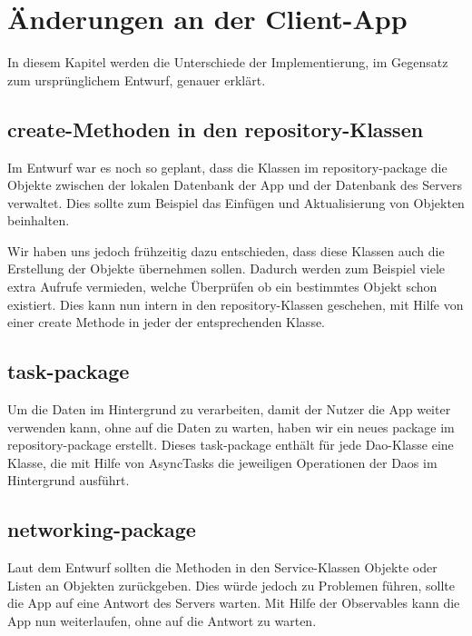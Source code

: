 
\section{Änderungen an der Client-App}

    In diesem Kapitel werden die Unterschiede der Implementierung, im Gegensatz zum ursprünglichem Entwurf, genauer erklärt.

    \subsection{create-Methoden in den repository-Klassen}

        Im Entwurf war es noch so geplant, dass die Klassen im repository-package die Objekte zwischen der lokalen Datenbank der App und der Datenbank des Servers verwaltet. Dies sollte zum Beispiel das Einfügen und Aktualisierung von Objekten beinhalten.

        Wir haben uns jedoch frühzeitig dazu entschieden, dass diese Klassen auch die Erstellung der Objekte übernehmen sollen. Dadurch werden zum Beispiel viele extra Aufrufe vermieden, welche Überprüfen ob ein bestimmtes Objekt schon existiert. Dies kann nun intern in den repository-Klassen geschehen, mit Hilfe von einer create Methode in jeder der entsprechenden Klasse.

    \subsection{task-package}

         Um die Daten im Hintergrund zu verarbeiten, damit der Nutzer die App weiter verwenden kann, ohne auf die Daten zu warten, haben wir ein neues package im repository-package erstellt.
         Dieses task-package enthält für jede Dao-Klasse eine Klasse, die mit Hilfe von AsyncTasks die jeweiligen Operationen der Daos im Hintergrund ausführt.

    \subsection{networking-package}

        Laut dem Entwurf sollten die Methoden in den Service-Klassen Objekte oder Listen an Objekten zurückgeben. Dies würde jedoch zu Problemen führen, sollte die App auf eine Antwort des Servers warten.
        Mit Hilfe der Observables kann die App nun weiterlaufen, ohne auf die Antwort zu warten.

